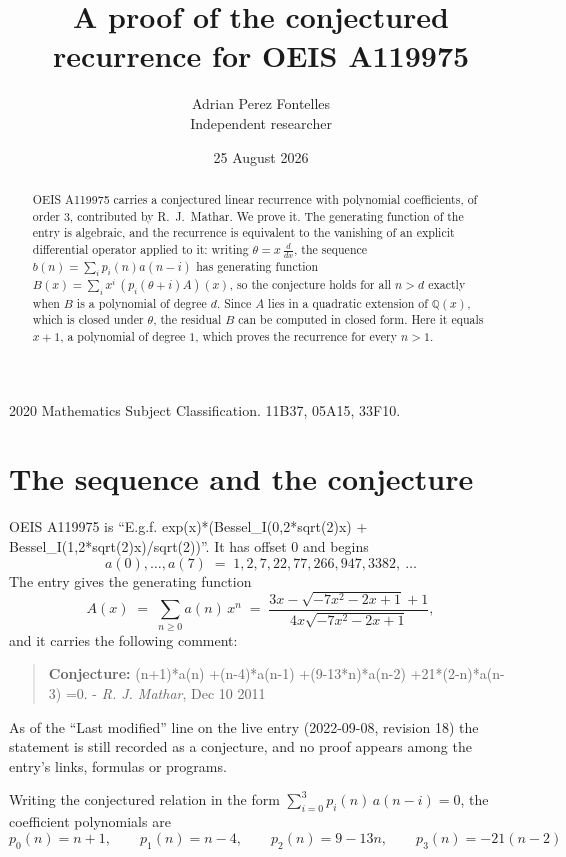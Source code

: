 \documentclass[11pt,a4paper]{article}
\title{A proof of the conjectured recurrence for OEIS A119975}
\author{Adrian Perez Fontelles\\ \small Independent researcher}
\date{25 August 2026}
\theoremstyle{plain}
\theoremstyle{definition}
\begin{document}
\maketitle

\begin{abstract}
OEIS A119975 carries a conjectured linear recurrence with polynomial coefficients, of
order 3, contributed by R.~J.~Mathar. We prove it. The generating function of the
entry is algebraic, and the recurrence is equivalent to the vanishing of an explicit
differential operator applied to it: writing $\theta=x\,\frac{d}{dx}$, the sequence
$b(n)=\sum_{i}p_{i}(n)a(n-i)$ has generating function
$B(x)=\sum_{i}x^{i}\,(p_{i}(\theta+i)A)(x)$, so the conjecture holds for all $n>d$ exactly
when $B$ is a polynomial of degree $d$. Since $A$ lies in a quadratic extension of
$\mathbb{Q}(x)$, which is closed under $\theta$, the residual $B$ can be computed in
closed form. Here it equals $x + 1$, a polynomial of degree $1$, which proves
the recurrence for every $n>1$.
\end{abstract}

\noindent\small 2020 Mathematics Subject Classification. 11B37, 05A15, 33F10.\normalsize

\section{The sequence and the conjecture}

OEIS A119975 is ``E.g.f. exp(x)*(Bessel\_I(0,2*sqrt(2)x) + Bessel\_I(1,2*sqrt(2)x)/sqrt(2))''. It has offset $0$ and begins
\[
a(0),\dots,a(7)\;=\;1, 2, 7, 22, 77, 266, 947, 3382,\ \dots
\]
The entry gives the generating function
\begin{equation}\label{eq:gf}
A(x)\;=\;\sum_{n\ge 0} a(n)\,x^{n}\;=\;\frac{3 x - \sqrt{- 7 x^{2} - 2 x + 1} + 1}{4 x \sqrt{- 7 x^{2} - 2 x + 1}} ,
\end{equation}
and it carries the following comment:
\begin{quote}\small
\textbf{Conjecture:} (n+1)*a(n) +(n-4)*a(n-1) +(9-13*n)*a(n-2) +21*(2-n)*a(n-3) =0. - \emph{R. J. Mathar}, Dec 10 2011
\end{quote}
As of the ``Last modified'' line on the live entry (2022-09-08, revision 18) the
statement is still recorded as a conjecture, and no proof appears among the entry's links,
formulas or programs.

Writing the conjectured relation in the form $\sum_{i=0}^{3}p_{i}(n)\,a(n-i)=0$,
the coefficient polynomials are
\[
p_{0}(n)=n + 1,\qquad p_{1}(n)=n - 4,\qquad p_{2}(n)=9 - 13 n,\qquad p_{3}(n)=- 21 \left(n - 2\right)
\]
\end{document}
